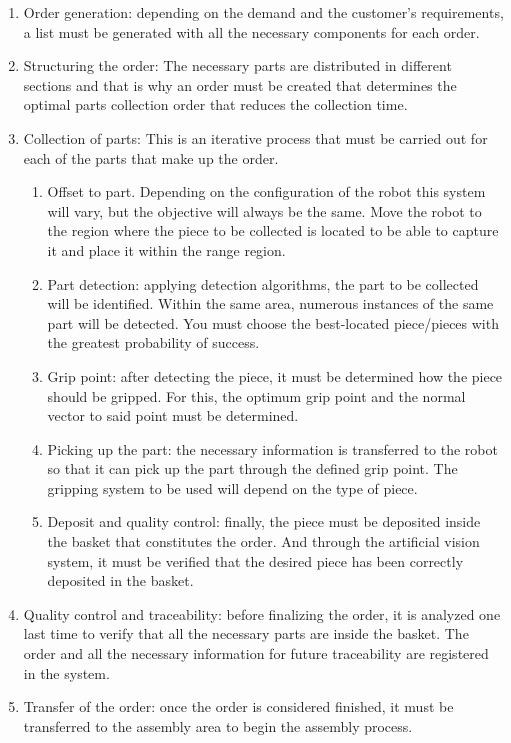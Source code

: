 {\begin{enumerate}
\item Order generation: depending on the demand and the customer's requirements, a list must be generated with all the necessary components for each order.
\item Structuring the order: The necessary parts are distributed in different sections and that is why an order must be created that determines the optimal parts collection order that reduces the collection time.
\item Collection of parts: This is an iterative process that must be carried out for each of the parts that make up the order.
\begin{enumerate}[label*=\arabic*.]
\item Offset to part. Depending on the configuration of the robot this system will vary, but the objective will always be the same. Move the robot to the region where the piece to be collected is located to be able to capture it and place it within the range region.
\item Part detection: applying detection algorithms, the part to be collected will be identified. Within the same area, numerous instances of the same part will be detected. You must choose the best-located piece/pieces with the greatest probability of success.
\item Grip point: after detecting the piece, it must be determined how the piece should be gripped. For this, the optimum grip point and the normal vector to said point must be determined.
\item Picking up the part: the necessary information is transferred to the robot so that it can pick up the part through the defined grip point. The gripping system to be used will depend on the type of piece.
\item Deposit and quality control: finally, the piece must be deposited inside the basket that constitutes the order. And through the artificial vision system, it must be verified that the desired piece has been correctly deposited in the basket.
\end{enumerate}
\item Quality control and traceability: before finalizing the order, it is analyzed one last time to verify that all the necessary parts are inside the basket. The order and all the necessary information for future traceability are registered in the system.
\item Transfer of the order: once the order is considered finished, it must be transferred to the assembly area to begin the assembly process.
\end{enumerate}

}
